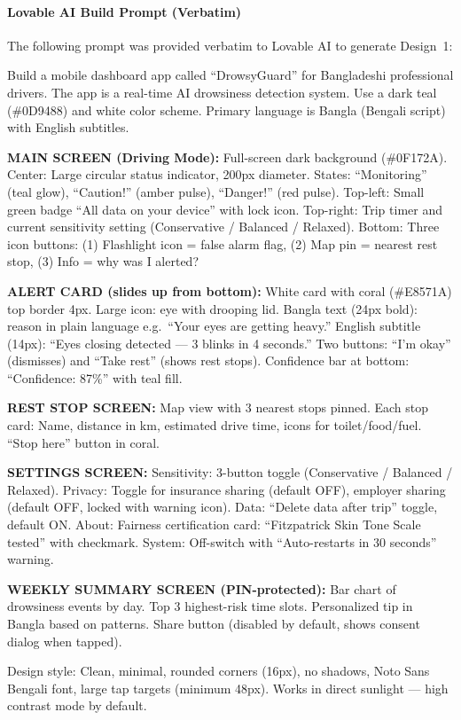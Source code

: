 \documentclass[sigconf]{acmart}
\begin{document}
\paragraph{Lovable AI Build Prompt (Verbatim)}
The following prompt was provided verbatim to Lovable AI to generate Design~1:

\begin{promptbox}
Build a mobile dashboard app called ``DrowsyGuard'' for Bangladeshi professional drivers. The app is a real-time AI drowsiness detection system. Use a dark teal (\#0D9488) and white color scheme. Primary language is Bangla (Bengali script) with English subtitles.

\textbf{MAIN SCREEN (Driving Mode):} Full-screen dark background (\#0F172A). Center: Large circular status indicator, 200px diameter. States: ``Monitoring'' (teal glow), ``Caution!'' (amber pulse), ``Danger!'' (red pulse). Top-left: Small green badge ``All data on your device'' with lock icon. Top-right: Trip timer and current sensitivity setting (Conservative / Balanced / Relaxed). Bottom: Three icon buttons: (1) Flashlight icon = false alarm flag, (2) Map pin = nearest rest stop, (3) Info = why was I alerted?

\textbf{ALERT CARD (slides up from bottom):} White card with coral (\#E8571A) top border 4px. Large icon: eye with drooping lid. Bangla text (24px bold): reason in plain language e.g.\ ``Your eyes are getting heavy.'' English subtitle (14px): ``Eyes closing detected --- 3 blinks in 4 seconds.'' Two buttons: ``I'm okay'' (dismisses) and ``Take rest'' (shows rest stops). Confidence bar at bottom: ``Confidence: 87\%'' with teal fill.

\textbf{REST STOP SCREEN:} Map view with 3 nearest stops pinned. Each stop card: Name, distance in km, estimated drive time, icons for toilet/food/fuel. ``Stop here'' button in coral.

\textbf{SETTINGS SCREEN:} Sensitivity: 3-button toggle (Conservative / Balanced / Relaxed). Privacy: Toggle for insurance sharing (default OFF), employer sharing (default OFF, locked with warning icon). Data: ``Delete data after trip'' toggle, default ON. About: Fairness certification card: ``Fitzpatrick Skin Tone Scale tested'' with checkmark. System: Off-switch with ``Auto-restarts in 30 seconds'' warning.

\textbf{WEEKLY SUMMARY SCREEN (PIN-protected):} Bar chart of drowsiness events by day. Top 3 highest-risk time slots. Personalized tip in Bangla based on patterns. Share button (disabled by default, shows consent dialog when tapped).

Design style: Clean, minimal, rounded corners (16px), no shadows, Noto Sans Bengali font, large tap targets (minimum 48px). Works in direct sunlight --- high contrast mode by default.
\end{promptbox}
\end{document}

